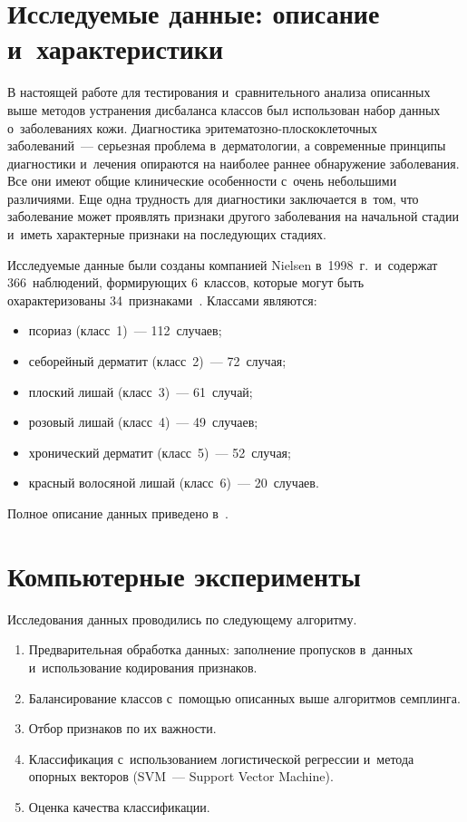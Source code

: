 \begin{multicols}{2}
\section{Исследуемые данные: описание и~характеристики}

  В настоящей работе для тестирования и~сравнительного анализа описанных 
выше методов устранения дисбаланса классов был использован набор данных 
о~заболеваниях кожи. Диагностика эри\-те\-ма\-тоз\-но-плос\-ко\-кле\-точ\-ных 
заболеваний~--- серь\-ез\-ная проб\-ле\-ма в~дерматологии, а современные принципы 
диагностики и~лечения опираются на наиболее раннее обнаружение заболевания. 
Все они имеют общие клинические особенности с~очень небольшими 
различиями. Еще одна трудность для диагностики заключается в~том, что 
заболевание может проявлять признаки другого заболевания на начальной 
стадии и~иметь характерные признаки на последующих стадиях. 
  
  Исследуемые данные были созданы компанией Nielsen в~1998~г.\ и~содержат 
366~наблюдений, формирующих 6~классов, которые могут быть 
охарактеризованы 34~признаками~\cite{8-sev}. Классами являются: 
\begin{itemize}
\item псориаз 
(класс~1)~--- 112~случаев; 
\item себорейный дерматит (класс~2)~--- 72~случая; 
\item плоский лишай (класс~3)~--- 61~случай; 
\item розовый лишай (класс~4)~--- 49~случаев; 
\item хронический дерматит (класс~5)~--- 52~случая; 
\item красный волосяной 
лишай (класс~6)~--- 20~случаев.
\end{itemize}
 Полное описание данных приведено 
в~\cite{11-sev}.
  
\section{Компьютерные эксперименты}

  Исследования данных проводились по сле\-ду\-юще\-му алгоритму.
  \begin{enumerate}[1.]
\item Предварительная обработка данных: заполнение пропусков в~данных 
и~использование кодирования признаков. 
\item Балансирование классов с~помощью описанных выше алгоритмов 
семплинга.
\item Отбор признаков по их важности. 
\item Классификация с~использованием логистической регрессии и~метода 
опорных векторов (SVM~--- Support Vector Machine).
\item Оценка качества классификации.
\end{enumerate}


\end{multicols}
